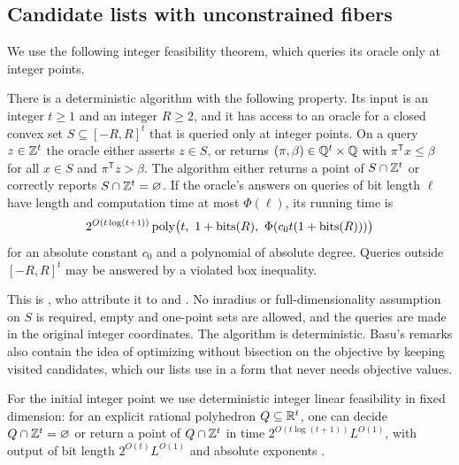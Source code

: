 \subsection{Candidate lists with unconstrained fibers}
\label{app:constraints-lists}

We use the following integer feasibility theorem, which queries its oracle
only at integer points.

\begin{theorem}
\label{thm:constraints-integer-query}
There is a deterministic algorithm with the following property. Its input is
an integer $t\ge1$ and an integer $R\ge2$, and it has access to an oracle for
a closed convex set $S\subseteq[-R,R]^t$ that is queried only at integer
points. On a query $z\in\mathbb Z^t$ the oracle either asserts $z\in S$, or returns
$(\pi,\beta)\in\mathbb Q^t\times\mathbb Q$ with $\pi^{\mathsf T}x\le\beta$ for all $x\in S$
and $\pi^{\mathsf T}z>\beta$. The algorithm either returns a point of
$S\cap\mathbb Z^t$ or correctly reports $S\cap\mathbb Z^t=\varnothing$. If the oracle's
answers on queries of bit length $\ell$ have length and computation time at
most $\Phi(\ell)$, its running time is
\[
 2^{O(t\log(t+1))}\poly\bigl(t,\ 1+\bits(R),\ \Phi(c_0t(1+\bits(R)))\bigr)
\]
for an absolute constant $c_0$ and a polynomial of absolute degree. Queries
outside $[-R,R]^t$ may be answered by a violated box inequality.
\end{theorem}

This is \citet[Definition~3.4 and Theorem~3.5]{AriHildebrand2026}, who
attribute it to \citet[Theorem~9 and Appendix~B]{HildebrandGoess2024} and
\citet[Theorem~5.7 and Remark~5.11]{Basu2023Integers}. No inradius or
full-dimensionality assumption on $S$ is required, empty and one-point sets
are allowed, and the queries are made in the original integer coordinates.
The algorithm is deterministic. Basu's remarks also contain the idea of
optimizing without bisection on the objective by keeping visited candidates,
which our lists use in a form that never needs objective values.

For the initial integer point we use deterministic integer linear feasibility
in fixed dimension: for an explicit rational polyhedron $Q\subseteq\mathbb R^t$, one
can decide $Q\cap\mathbb Z^t=\varnothing$ or return a point of $Q\cap\mathbb Z^t$ in time
$2^{O(t\log(t+1))}L^{O(1)}$, with output of bit length $2^{O(t)}L^{O(1)}$ and
absolute exponents \citep[Theorem~1.1, specialized to linear constraints and a
constant objective]{HildebrandKoeppe2013}.

